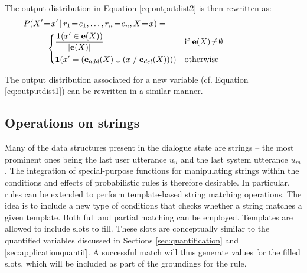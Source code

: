 The output distribution in Equation \eqref{eq:outputdist2} is then rewritten as:
\begin{align}
&P(X'\!=\!x' \, | \, r_1\!=\!e_1, \dots, r_n\!=\!e_n, X\!=\!x) = \hspace{5cm} \nonumber \\ & \; \; \; \; \; \; \; \; \; \;  \begin{dcases} 
\frac{ \mathbf{1}(x' \in {\mathbf{e}(X)})} { |\mathbf{e}(X)| }  & \text{if } \mathbf{e}(X)\!\neq\!\emptyset \\
\mathbf{1}(x' = \left(\mathbf{e}_{add}(X) \cup \left(x \; / \; \mathbf{e}_{del}(X)\right)\right)) & \text{otherwise} \\
\end{dcases}\label{eq:outputdist4}
\end{align} 

The output distribution associated for a new variable (cf. Equation \eqref{eq:outputdist1}) can be rewritten in a similar manner.




\subsection{Operations on strings}

Many of the data structures present in the dialogue state are strings -- the most prominent ones being the last user utterance $u_u$ and the last system utterance $u_m$. The integration of special-purpose functions for manipulating strings within the conditions and effects of probabilistic rules is therefore desirable. In particular, rules can be extended to perform template-based string matching operations.  The idea is to include a new type of conditions that checks whether a string matches a given template.  Both full and partial matching can be employed. Templates are allowed to include slots to fill. These slots are conceptually similar to the quantified variables discussed in Sections \ref{sec:quantification} and \ref{sec:applicationquantif}. A successful match will thus generate values for the filled slots, which will be included as part of the groundings for the rule. 

